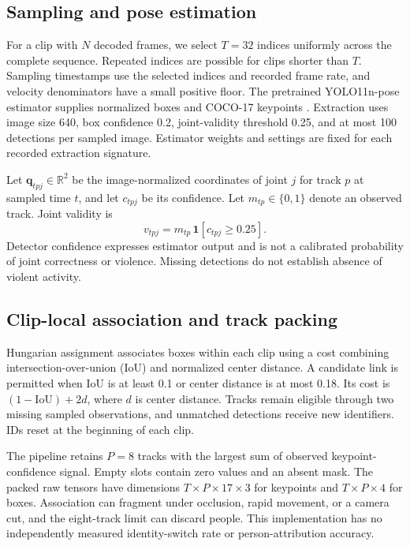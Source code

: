 \documentclass[journal]{IEEEtai}
\newcommand{\R}{\mathbb{R}}
\begin{document}
\subsection{Sampling and pose estimation}
For a clip with $N$ decoded frames, we select $T=32$ indices uniformly across the complete sequence. Repeated indices are possible for clips shorter than $T$. Sampling timestamps use the selected indices and recorded frame rate, and velocity denominators have a small positive floor. The pretrained YOLO11n-pose estimator supplies normalized boxes and COCO-17 keypoints \cite{ultralytics}. Extraction uses image size 640, box confidence 0.2, joint-validity threshold 0.25, and at most 100 detections per sampled image. Estimator weights and settings are fixed for each recorded extraction signature.

Let $\mathbf{q}_{tpj}\in\R^2$ be the image-normalized coordinates of joint $j$ for track $p$ at sampled time $t$, and let $c_{tpj}$ be its confidence. Let $m_{tp}\in\{0,1\}$ denote an observed track. Joint validity is
\begin{equation}
v_{tpj}=m_{tp}\,\mathbf{1}[c_{tpj}\geq 0.25].
\label{eq:valid}
\end{equation}
Detector confidence expresses estimator output and is not a calibrated probability of joint correctness or violence. Missing detections do not establish absence of violent activity.

\subsection{Clip-local association and track packing}
Hungarian assignment \cite{kuhn1955} associates boxes within each clip using a cost combining intersection-over-union (IoU) and normalized center distance. A candidate link is permitted when IoU is at least 0.1 or center distance is at most 0.18. Its cost is $(1-\mathrm{IoU})+2d$, where $d$ is center distance. Tracks remain eligible through two missing sampled observations, and unmatched detections receive new identifiers. IDs reset at the beginning of each clip.

The pipeline retains $P=8$ tracks with the largest sum of observed keypoint-confidence signal. Empty slots contain zero values and an absent mask. The packed raw tensors have dimensions $T\times P\times17\times3$ for keypoints and $T\times P\times4$ for boxes. Association can fragment under occlusion, rapid movement, or a camera cut, and the eight-track limit can discard people. This implementation has no independently measured identity-switch rate or person-attribution accuracy.
\end{document}

